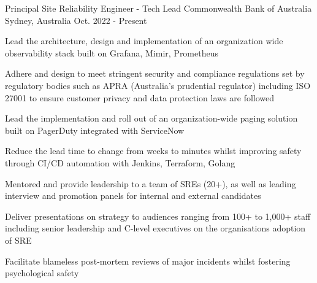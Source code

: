 

\begin{cventries}
  \cventry
    {Principal Site Reliability Engineer - Tech Lead} %
    {Commonwealth Bank of Australia} %
    {Sydney, Australia} %
    {Oct. 2022 - Present} %
    {
      \begin{cvitems} %
      \item {Lead the architecture, design and implementation of an organization wide observability stack built on Grafana, Mimir, Prometheus}
      \item {Adhere and design to meet stringent security and compliance regulations set by regulatory bodies such as APRA (Australia's prudential regulator) including ISO 27001 to ensure customer privacy and data protection laws are followed}
      \item {Lead the implementation and roll out of an organization-wide paging solution built on PagerDuty integrated with ServiceNow}
      \item {Reduce the lead time to change from weeks to minutes whilst improving safety through CI/CD automation with Jenkins, Terraform, Golang}
      \item {Mentored and provide leadership to a team of SREs (20+), as well as leading interview and promotion panels for internal and external candidates}
      \item {Deliver presentations on strategy to audiences ranging from 100+ to 1,000+ staff including senior leadership and C-level executives on the organisations adoption of SRE}
      \item {Facilitate blameless post-mortem reviews of major incidents whilst fostering psychological safety}
      \end{cvitems}
    }



\end{cventries}
